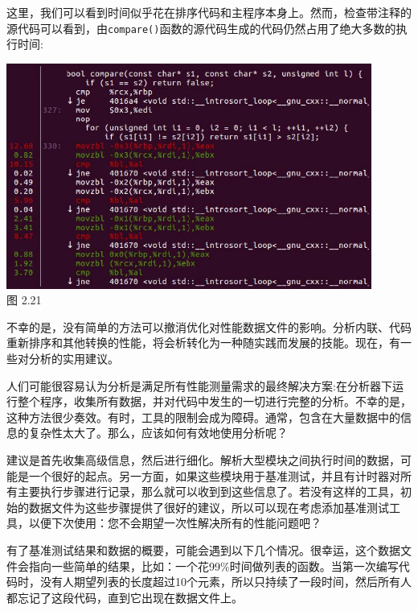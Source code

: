 这里，我们可以看到时间似乎花在排序代码和主程序本身上。然而，检查带注释的源代码可以看到，由\texttt{compare()}函数的源代码生成的代码仍然占用了绝大多数的执行时间:

\begin{center}
\includegraphics[width=0.9\textwidth]{content/1/chapter2/images/21.jpg}\\
图 2.21
\end{center}

不幸的是，没有简单的方法可以撤消优化对性能数据文件的影响。分析内联、代码重新排序和其他转换的性能，将会析转化为一种随实践而发展的技能。现在，有一些对分析的实用建议。


人们可能很容易认为分析是满足所有性能测量需求的最终解决方案:在分析器下运行整个程序，收集所有数据，并对代码中发生的一切进行完整的分析。不幸的是，这种方法很少奏效。有时，工具的限制会成为障碍。通常，包含在大量数据中的信息的复杂性太大了。那么，应该如何有效地使用分析呢？

建议是首先收集高级信息，然后进行细化。解析大型模块之间执行时间的数据，可能是一个很好的起点。另一方面，如果这些模块用于基准测试，并且有计时器对所有主要执行步骤进行记录，那么就可以收到到这些信息了。若没有这样的工具，初始的数据文件为这些步骤提供了很好的建议，所以可以现在考虑添加基准测试工具，以便下次使用：您不会期望一次性解决所有的性能问题吧？

有了基准测试结果和数据的概要，可能会遇到以下几个情况。很幸运，这个数据文件会指向一些简单的结果，比如：一个花99\%时间做列表的函数。当第一次编写代码时，没有人期望列表的长度超过10个元素，所以只持续了一段时间，然后所有人都忘记了这段代码，直到它出现在数据文件上。


